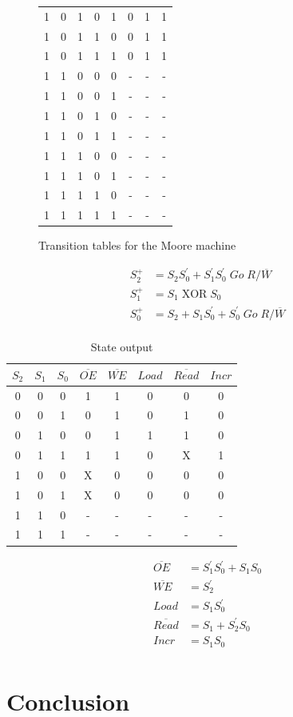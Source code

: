 \documentclass[11pt]{article}
\begin{document}
\begin{figure}[htpb]
{\begin{tabular}{c c c c c | c c c}
			1 & 0 & 1 & 0 & 1 & 0 & 1 & 1 \\
			1 & 0 & 1 & 1 & 0 & 0 & 1 & 1 \\
			1 & 0 & 1 & 1 & 1 & 0 & 1 & 1 \\
			1 & 1 & 0 & 0 & 0 & - & - & - \\
			1 & 1 & 0 & 0 & 1 & - & - & - \\
			1 & 1 & 0 & 1 & 0 & - & - & - \\
			1 & 1 & 0 & 1 & 1 & - & - & - \\
			1 & 1 & 1 & 0 & 0 & - & - & - \\
			1 & 1 & 1 & 0 & 1 & - & - & - \\
			1 & 1 & 1 & 1 & 0 & - & - & - \\
			1 & 1 & 1 & 1 & 1 & - & - & - \\
		\end{tabular}
	}
	\caption[figurename=Table]{Transition tables for the Moore machine}
	\label{table:transition-mealy}
\end{figure}

\begin{align*}
	S_2^+ &= S_2 S_0^{\prime} + S_1^{\prime} S_0^{\prime}\; Go\; R/\overline{W}\\
	S_1^+ &= S_1\; \text{XOR}\; S_0 \\
	S_0^+ &= S_2 + S_1 S_0^{\prime} + S_0^{\prime}\; Go\; R/\overline{W} \\
\end{align*}

\begin{table}
	\centering
		\begin{tabular}{c c c | c c c c c }
			$S_2$ & $S_1$ & $S_0$ & $\overline{OE}$ & $\overline{WE}$ & $Load$ & $\overline{Read}$ & $Incr$\\
			\hline
			0 & 0 & 0 & 1 & 1 & 0 & 0 & 0 \\
			0 & 0 & 1 & 0 & 1 & 0 & 1 & 0 \\
			0 & 1 & 0 & 0 & 1 & 1 & 1 & 0 \\
			0 & 1 & 1 & 1 & 1 & 0 & X & 1 \\
			1 & 0 & 0 & X & 0 & 0 & 0 & 0 \\
			1 & 0 & 1 & X & 0 & 0 & 0 & 0 \\
			1 & 1 & 0 & - & - & - & - & - \\
			1 & 1 & 1 & - & - & - & - & - \\
		\end{tabular}
	\caption{State output}
\end{table}

\begin{align*}
	\overline{OE} &= S_1^{\prime} S_0^{\prime} + S_1 S_0 \\
	\overline{WE} &= S_2^{\prime} \\
	Load &= S_1 S_0^{\prime} \\
	\overline{Read} &= S_1 + S_2^{\prime} S_0 \\
	Incr &= S_1 S_0 \\
\end{align*}

\section{Conclusion}
\end{document}

